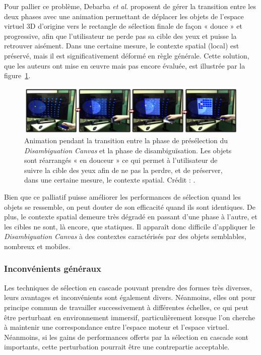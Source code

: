 	Pour pallier ce problème, Debarba \emph{et al.} proposent de gérer la transition entre les deux phases avec une animation permettant de déplacer les objets de l'espace virtuel 3D d'origine vers le rectangle de sélection finale de façon « douce » et progressive, afin que l'utilisateur ne perde pas sa cible des yeux et puisse la retrouver aisément. Dans une certaine mesure, le contexte spatial (local) est préservé, mais il est significativement déformé en règle générale. Cette solution, que les auteurs ont mise en \oe{}uvre mais pas encore évaluée, est illustrée par la figure~\ref{fig:dCanvasContext}.
	
	\begin{figure}[H]
		\centering
		\includegraphics[width=\textwidth]{figures/ch2/dCanvasContext}
		\caption[\emph{Disambiguation Canvas} --- Animation de transition]{Animation pendant la transition entre la phase de présélection du \emph{Disambiguation Canvas} et la phase de disambiguïsation. Les objets sont réarrangés « en douceur » ce qui permet à l'utilisateur de suivre la cible des yeux afin de ne pas la perdre, et de préserver, dans une certaine mesure, le contexte spatial. Crédit : \cite{debarba2013disambiguation}.}
		\label{fig:dCanvasContext}
	\end{figure}
	
	Bien que ce palliatif puisse améliorer les performances de sélection quand les objets se ressemble, on peut douter de son efficacité quand ils sont identiques. De plus, le contexte spatial demeure très dégradé en passant d'une phase à l'autre, et les cibles ne sont, là encore, que statiques. Il apparaît donc difficile d'appliquer le \emph{Disambiguation Canvas} à des contextes caractérisés par des objets semblables, nombreux et mobiles.
	
	\subsubsection{Inconvénients généraux}
	Les techniques de sélection en cascade pouvant prendre des formes très diverses, leurs avantages et inconvénients sont également divers. Néanmoins, elles ont pour principe commun de travailler successivement à différentes échelles, ce qui peut être perturbant en environnement immersif, particulièrement lorsque l'on cherche à maintenir une correspondance entre l'espace moteur et l'espace virtuel. Néanmoins, si les gains de performances offerts par la sélection en cascade sont importants, cette perturbation pourrait être une contrepartie acceptable.
	
